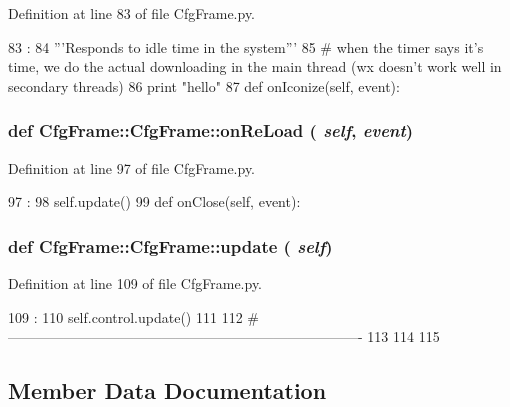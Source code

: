 Definition at line 83 of file CfgFrame.py.


\begin{DoxyCode}
83                            :
84         '''Responds to idle time in the system'''
85         # when the timer says it's time, we do the actual downloading in the main
       thread (wx doesn't work well in secondary threads)
86         print "hello"        
87 
    def onIconize(self, event):
\end{DoxyCode}
\hypertarget{classCfgFrame_1_1CfgFrame_a93a31956d0d1c94648a4f786e2321e7f}{
\subsubsection[{onReLoad}]{\setlength{\rightskip}{0pt plus 5cm}def CfgFrame::CfgFrame::onReLoad ( {\em self}, \/   {\em event})}}
\label{classCfgFrame_1_1CfgFrame_a93a31956d0d1c94648a4f786e2321e7f}


Definition at line 97 of file CfgFrame.py.


\begin{DoxyCode}
97                              :
98         self.update()
99 
    def onClose(self, event):
\end{DoxyCode}
\hypertarget{classCfgFrame_1_1CfgFrame_a6c8549da5a53c3f4a25a2811a8b864c6}{
\subsubsection[{update}]{\setlength{\rightskip}{0pt plus 5cm}def CfgFrame::CfgFrame::update ( {\em self})}}
\label{classCfgFrame_1_1CfgFrame_a6c8549da5a53c3f4a25a2811a8b864c6}


Definition at line 109 of file CfgFrame.py.


\begin{DoxyCode}
109                     :
110         self.control.update()
111         
112 #----------------------------------------------------------------------------
113 
114 
115 

\end{DoxyCode}


\subsection{Member Data Documentation}
\hypertarget{classCfgFrame_1_1CfgFrame_a7bf641fd25de33d826971d3ccd86991e}{
\subsubsection[{app}]{}}
\label{classCfgFrame_1_1CfgFrame_a7bf641fd25de33d826971d3ccd86991e}


